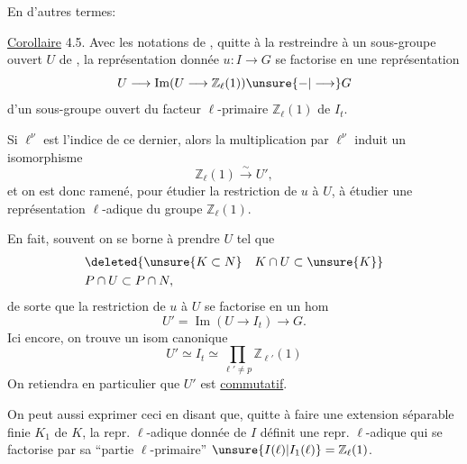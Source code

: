 En d'autres termes:

\uline{Corollaire} 4.5. Avec les notations de , quitte à  la restreindre à un sous-groupe ouvert  $U$ de , la représentation donnée $u:I\longrightarrow G$ se factorise en une représentation
\[
U\longrightarrow\operatorname{Im}(U\longrightarrow\mathbb Z_\ell(1))\unsure{-|\longrightarrow}G
\]
d'un sous-groupe ouvert  du facteur  $\ell$-primaire $\mathbb Z_\ell(1)$ de $I_t$.

Si $\ell^\nu$ est l'indice de ce dernier, alors la multiplication par $\ell^\nu$ induit un isomorphisme
\[
\mathbb Z_\ell(1)\xrightarrow{\sim}U',
\tag*{(4.7)}
\]
et on est donc ramené, pour étudier la restriction de $u$ à $U$, à étudier une représentation $\ell$-adique du groupe $\mathbb Z_\ell(1)$.

En fait, souvent on se borne à prendre $U$ tel que
\[
\begin{aligned}
&\deleted{\unsure{K\subset N}\quad K\cap U\subset\unsure{K}}\\
&P\cap U\subset P\cap N,
\end{aligned}
\]
de sorte que la restriction de $u$ à $U$ se factorise en un hom
\[
U'=\operatorname{Im}(U\longrightarrow I_t)\longrightarrow G.
\]
Ici encore, on trouve un isom canonique
\[
U'\simeq I_t\simeq\prod_{\ell'\ne p}\mathbb Z_{\ell'}(1)
\tag*{(4.8)}
\]
On retiendra en particulier que $U'$ est \uline{commutatif}.

 On peut aussi exprimer ceci en disant que, quitte à faire une extension séparable finie $K_1$ de $K$, la repr. $\ell$-adique donnée de $I$ définit une repr. $\ell$-adique  qui se factorise par sa ``partie $\ell$-primaire'' $\unsure{I(\ell)|I_1(\ell)}=\mathbb Z_\ell(1)$.
